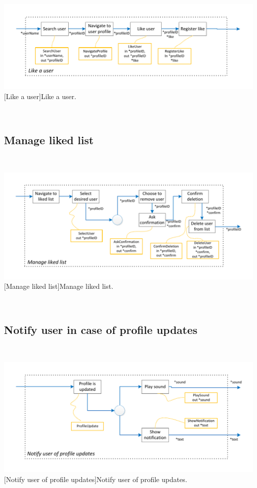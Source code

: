 \documentclass[11pt, a4paper,svglistings,oneside]{book}
\begin{document}
$\;$ \\
\noindent\begin{minipage}{\textwidth}
    \centering
   \includegraphics[scale=1]{nav_LikeUser.pdf}
 [Like a user]{Like a user.}
\end{minipage}
$\;$ \\ 

\subsection{Manage liked list}

$\;$ \\
\noindent\begin{minipage}{\textwidth}
    \centering
   \includegraphics[scale=1]{nav_ManageLikedList.pdf}
 [Manage liked list]{Manage liked list.}
\end{minipage}
$\;$ \\ 

\subsection{Notify user in case of profile updates}

$\;$ \\
\noindent\begin{minipage}{\textwidth}
    \centering
   \includegraphics[scale=1]{nav_NotifyProfileUpdate.pdf}
 [Notify user of profile updates]{Notify user of profile updates.}
\end{minipage}
$\;$ \\ 
\end{document}
